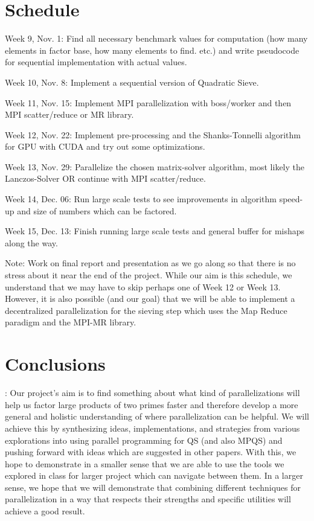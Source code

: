 \documentclass[11pt,twocolumn]{article}
\newenvironment{my_enumerate}{
  \begin{enumerate}
    \setlength{\itemsep}{1pt}
      \setlength{\parskip}{0pt}
\setlength{\parsep}{0pt}}{\end{enumerate}
}
\begin{document}
\section {Schedule}\label{sched}
\begin{my_enumerate}
  \item Week 9, Nov. 1: Find all necessary benchmark values for computation (how many elements in factor base, how many elements to find. etc.) and write pseudocode for sequential implementation with actual values.
  \item Week 10, Nov. 8: Implement a sequential version of Quadratic Sieve.
  \item Week 11, Nov. 15: Implement MPI parallelization with boss/worker and then MPI scatter/reduce or MR library.
  \item Week 12, Nov. 22: Implement pre-processing and the Shanks-Tonnelli algorithm for GPU with CUDA and try out some optimizations.
  \item Week 13, Nov. 29: Parallelize the chosen matrix-solver algorithm, most likely the Lanczos-Solver OR continue with MPI scatter/reduce.
  \item Week 14, Dec. 06: Run large scale tests to see improvements in algorithm speed-up and size of numbers which can be factored.
  \item Week 15, Dec. 13: Finish running large scale tests and general buffer for mishaps along the way.
\end{my_enumerate}

Note: Work on final report and presentation as we go along so that there is no stress about it near the end of the project. While our aim is this schedule, we understand that we may have to skip perhaps one of Week 12 or Week 13. However, it is also possible (and our goal) that we will be able to implement a decentralized parallelization for the sieving step which uses the Map Reduce paradigm and the MPI-MR library.

\section{Conclusions} \label{conc}: Our project's aim is to find something about what kind of parallelizations will help us factor large products of two primes faster and therefore develop a more general and holistic understanding of where parallelization can be helpful. We will achieve this by synthesizing ideas, implementations, and strategies from various explorations into using parallel programming for QS (and also MPQS) and pushing forward with ideas which are suggested in other papers. With this, we hope to demonstrate in a smaller sense that we are able to use the tools we explored in class for larger project which can navigate between them. In a larger sense, we hope that we will demonstrate that combining different techniques for parallelization in a way that respects their strengths and specific utilities will achieve a good result.
\end{document}
